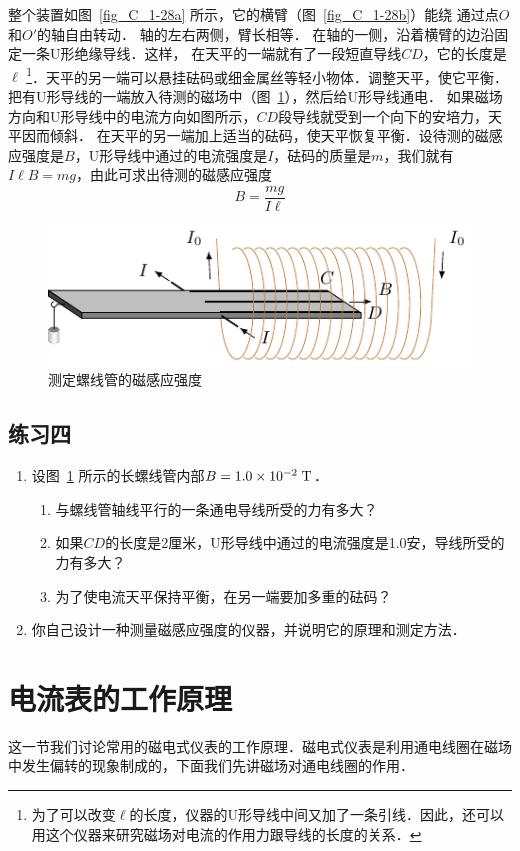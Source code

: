 整个装置如图~\ref{fig_C_1-28a} 所示，它的横臂（图~\ref{fig_C_1-28b}）能绕
通过点$O$和$O'$的轴自由转动．
轴的左右两侧，臂长相等．
在轴的一侧，沿着横臂的边沿固定一条U形绝缘导线．这样，
在天平的一端就有了一段短直导线$CD$，它的长度是$\ell$ \footnote{为了可以改变$\ell$的长度，仪器的U形导线中间又加了一条引线．因此，还可以用这个仪器来研究磁场对电流的作用力跟导线的长度的关系．}．天平的另一端可以悬挂砝码或细金属丝等轻小物体．调整天平，使它平衡．把有U形导线的一端放入待测的磁场中（图~\ref{fig_C_1-29}），然后给U形导线通电．
如果磁场方向和U形导线中的电流方向如图所示，$CD$段导线就受到一个向下的安培力，天平因而倾斜．
在天平的另一端加上适当的砝码，使天平恢复平衡．设待测的磁感应强度是$B$，U形导线中通过的电流强度是$I$，砝码的质量是$m$，我们就有$I\ell B=mg$，由此可求出待测的磁感应强度
\[B=\frac{mg}{I\ell}\]
\begin{figure}[htbp]
	\centering
	\includegraphics{fig/C/1-29.pdf}
	\caption{测定螺线管的磁感应强度}\label{fig_C_1-29}
\end{figure}

\subsection*{练习四}
\begin{enumerate}
    \item 设图~\ref{fig_C_1-29} 所示的长螺线管内部$B=1.0\times10^{-2} \;\text{T} $．
    \begin{enumerate}
        \item 与螺线管轴线平行的一条通电导线所受的力有多大？
        \item 如果$CD$的长度是2厘米，U形导线中通过的电流强度是1.0安，导线所受的力有多大？
        \item 为了使电流天平保持平衡，在另一端要加多重的砝码？
    \end{enumerate}
    \item 你自己设计一种测量磁感应强度的仪器，并说明它的原理和测定方法．
\end{enumerate}


\section{电流表的工作原理}
这一节我们讨论常用的磁电式仪表的工作原理．磁电式仪表是利用通电线圈在磁场中发生偏转的现象制成的，下面我们先讲磁场对通电线圈的作用．

